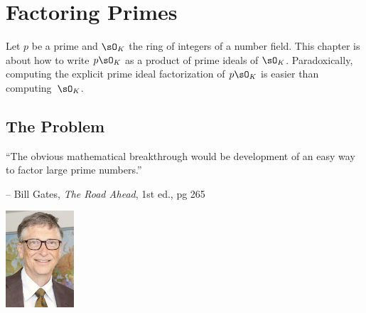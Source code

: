 
\chapter{Factoring Primes}\label{ch:factoring_primes}

Let $p$ be a prime and $\sO_K$ the ring of integers of a number field.
This chapter is about how to write $p\sO_K$ as a product of prime ideals
of $\sO_K$. Paradoxically, computing the explicit prime ideal factorization
of $p\sO_K$ is easier than computing~$\sO_K$.




\section{The Problem}

\begin{center}
\begin{minipage}{0.7\linewidth}
``The obvious mathematical breakthrough would be development of an easy
way to factor large prime numbers.''

-- {Bill Gates, {\em The Road Ahead}, 1st ed., pg 265}
\end{minipage}
\begin{minipage}{0.2\linewidth}
\includegraphics[width=1in]{img/Bill_Gates_June_2015}
\end{minipage}
\end{center}

